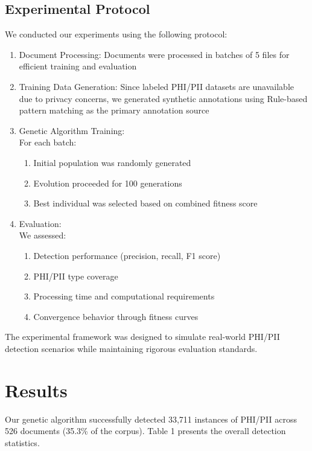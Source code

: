 \documentclass[conference]{IEEEtran}
\begin{document}
\subsection{\textbf{Experimental Protocol}}
We conducted our experiments using the following protocol:
\begin{enumerate}
\item Document Processing: Documents were processed in batches of 5 files for efficient training and evaluation
\item Training Data Generation: Since labeled PHI/PII datasets are unavailable due to privacy concerns, we generated synthetic annotations using Rule-based pattern matching as the primary annotation source
\item Genetic Algorithm Training: \\
For each batch:
\begin{enumerate}
\item Initial population was randomly generated
\item Evolution proceeded for 100 generations
\item Best individual was selected based on combined fitness score
\end{enumerate}
\item Evaluation: \\
We assessed:
\begin{enumerate}
\item Detection performance (precision, recall, F1 score)
\item PHI/PII type coverage
\item Processing time and computational requirements
\item Convergence behavior through fitness curves
\end{enumerate}
\end{enumerate}

The experimental framework was designed to simulate real-world PHI/PII detection scenarios while maintaining rigorous evaluation standards.

\section{\textbf{Results}}
Our genetic algorithm successfully detected 33,711 instances of PHI/PII across 526 documents (35.3\% of the corpus). Table 1 presents the overall detection statistics.
\end{document}

